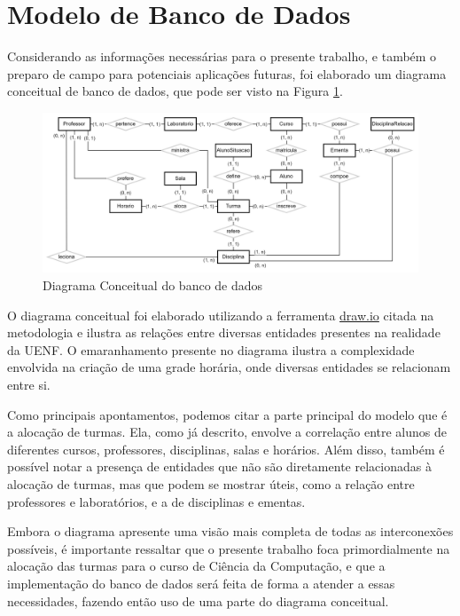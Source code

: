 \section{Modelo de Banco de Dados} \label{ModelagemBD} %

Considerando as informações necessárias para o presente trabalho, e também o preparo de campo para potenciais aplicações futuras, foi elaborado um diagrama conceitual de banco de dados, que pode ser visto na Figura \ref{fig:DiagramConceitual}.

\begin{figure}[htbp]\centering
  \caption{\label{fig:DiagramConceitual} Diagrama Conceitual do banco de dados}
  \includegraphics[scale=0.2]{files/img/DiagramaConceitual/DiagramaConceitualBranco.png}
\end{figure} %

O diagrama conceitual foi elaborado utilizando a ferramenta \href{https://www.drawio.com/}{draw.io} citada na metodologia e ilustra as relações entre diversas entidades presentes na realidade da UENF. O emaranhamento presente no diagrama ilustra a complexidade envolvida na criação de uma grade horária, onde diversas entidades se relacionam entre si.

Como principais apontamentos, podemos citar a parte principal do modelo que é a alocação de turmas. Ela, como já descrito, envolve a correlação entre alunos de diferentes cursos, professores, disciplinas, salas e horários. Além disso, também é possível notar a presença de entidades que não são diretamente relacionadas à alocação de turmas, mas que podem se mostrar úteis, como a relação entre professores e laboratórios, e a de disciplinas e ementas.

Embora o diagrama apresente uma visão mais completa de todas as interconexões possíveis, é importante ressaltar que o presente trabalho foca primordialmente na alocação das turmas para o curso de Ciência da Computação, e que a implementação do banco de dados será feita de forma a atender a essas necessidades, fazendo então uso de uma parte do diagrama conceitual.

